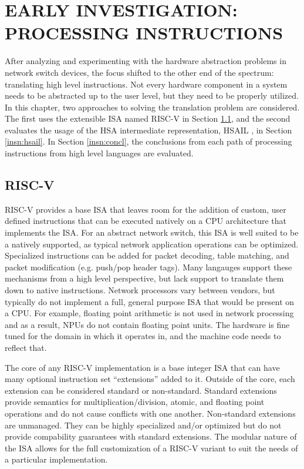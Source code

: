 \chapter{EARLY INVESTIGATION: PROCESSING INSTRUCTIONS}
\label{insn}
After analyzing and experimenting with the hardware abstraction problems in
network switch devices, the focus shifted to the other end of the spectrum:
translating high level instructions. Not every hardware component in a system
needs to be abstracted up to the user level, but they need to be properly
utilized. In this chapter, two approaches to solving the translation problem
are considered. The first uses the extensible ISA named RISC-V in Section
\ref{insn:riscv}, and the second evaluates the usage of the HSA intermediate
representation, HSAIL \cite{hsail}, in Section \ref{insn:hsail}. In Section
\ref{insn:concl}, the conclusions from each path of processing instructions
from high level languages are evaluated.

\section{RISC-V}
\label{insn:riscv}
RISC-V provides a base ISA that leaves room for the addition of custom, user
defined instructions that can be executed natively on a CPU architecture that
implements the ISA. For an abstract network switch, this ISA is well suited to
be a natively supported, as typical network application operations can be
optimized. Specialized instructions can be added for packet decoding, table
matching, and packet modification (e.g. push/pop header tags). Many langauges
support these mechanisms from a high level perspective, but lack support to
translate them down to native instructions. Network processors vary between
vendors, but typically do not implement a full, general purpose ISA that would
be present on a CPU. For example, floating point arithmetic is not used in
network processing and as a result, NPUs do not contain floating point units.
The hardware is fine tuned for the domain in which it operates in, and the
machine code needs to reflect that.

The core of any RISC-V implementation is a base integer ISA that can have many
optional instruction set ``extensions'' added to it. Outside of the core, each
extension can be considered standard or non-standard. Standard extensions
provide semantics for multiplication/division, atomic, and floating point
operations and do not cause conflicts with one another. Non-standard extensions
are unmanaged. They can be highly specialized and/or optimized but do not
provide compability guarantees with standard extensions. The modular nature
of the ISA allows for the full customization of a RISC-V variant to suit the
needs of a particular implementation.

